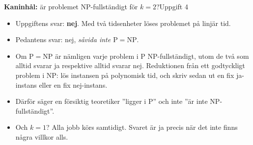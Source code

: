 \documentclass[aspectratio=169,10pt]{beamer}
\newcommand{\rabbit}{\textcolor{warnorange}{\textbf{Kaninhål:}} }
\begin{document}
\begin{frame}{\rabbit är problemet NP-fullständigt för $k=2$?}{Uppgift 4}
  \begin{itemize}
    \item<1-> Uppgiftens svar: \textbf{nej}. Med två tidsenheter löses problemet på linjär tid.
    \item<2-> Pedantens svar: nej, \emph{såvida inte $\mathrm{P}=\mathrm{NP}$}.
    \item<3-> Om $\mathrm{P}=\mathrm{NP}$ är nämligen varje problem i P NP-fullständigt, utom de två som alltid svarar ja respektive alltid svarar nej. Reduktionen från ett godtyckligt problem i NP: lös instansen på polynomisk tid, och skriv sedan ut en fix ja-instans eller en fix nej-instans.
    \item<4-> Därför säger en försiktig teoretiker ''ligger i P'' och inte ''är inte NP-fullständigt''.
    \item<5-> Och $k=1$? Alla jobb körs samtidigt. Svaret är ja precis när det inte finns några villkor alls.
  \end{itemize}
\end{frame}
\end{document}
